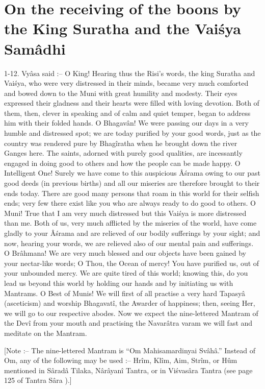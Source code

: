 ﻿\chapter{On the receiving of the boons by the King Suratha and the Vai\'sya Sam\^adhi}

1-12. Vy\^asa said :-- O King! Hearing thus the Risi's words, the king Suratha and Vai\'sya, who were very distressed in their minds, became very much comforted and bowed down to the Muni with great humility and modesty. Their eyes expressed their gladness and their hearts were filled with loving devotion. Both of them, then, clever in speaking and of calm and quiet temper, began to address him with their folded hands. O Bhagav\^an! We were passing our days in a very humble and distressed spot; we are today purified by your good words, just as the country was rendered pure by Bhag\^iratha when he brought down the river Ganges here. The saints, adorned with purely good qualities, are incessantly engaged in doing good to others and how the people can be made happy. O Intelligent One! Surely we have come to this auspicious \^A\'srama owing to our past good deeds (in previous births) and all our miseries are therefore brought to their ends today. There are good many persons that roam in this world for their selfish ends; very few there exist like you who are always ready to do good to others. O Muni! True that I am very much distressed but this Vai\'sya is more distressed than me. Both of us, very much afflicted by the miseries of the world, have come gladly to your \^A\'srama and are relieved of our bodily sufferings by your sight; and now, hearing your words, we are relieved also of our mental pain and sufferings. O Br\^ahmana! We are very much blessed and our objects have been gained by your nectar-like words; O Thou, the Ocean of mercy! You have purified us, out of your unbounded mercy. We are quite tired of this world; knowing this, do you lead us beyond this world by holding our hands and by initiating us with Mantrams. O Best of Munis! We will first of all practise a very hard Tapasy\^a (asceticism) and worship Bhagavat\^i, the Awarder of happiness; then, seeing Her, we will go to our respective abodes. Now we expect the nine-lettered Mantram of the Dev\^i from your mouth and practising the Navar\^atra varam we will fast and meditate on the Mantram.

[Note :-- The nine-lettered Mantram is ``Om Mahisamardinyai Sv\^ah\^a.'' Instead of Om, any of the following may be used :-- Hr\^im, Kl\^im, Aim, Str\^im, or H\^um mentioned in S\^arad\^a Tilaka, N\^ar\^ayan\^i Tantra, or in Vi\'svas\^ara Tantra (see page 125 of Tantra S\^ara ).]

